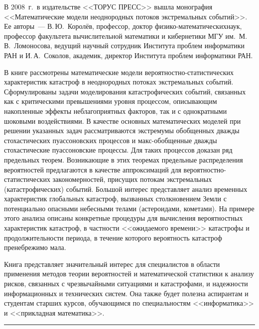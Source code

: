 \begin{multicols}{2}
 {\small
     В 2008~г.\ в издательстве <<ТОРУС ПРЕСС>> вышла монография <<Математические
модели неоднородных потоков экстремальных событий>>. Ее авторы~--- В.\,Ю.~Королёв,
профессор, доктор физико-математических\linebreak наук, профессор факультета вычислительной
математики и кибернетики МГУ им.\ М.\,В.~Ломоносова, ведущий научный сотрудник
Института проблем информатики РАН и И.\,А.~Соколов, академик, директор Института
проблем информатики РАН.

     В книге рассмотрены математические модели вероятностно-статистических
характеристик катастроф в неоднородных потоках экстремальных событий. Сформулированы
задачи моделирования катастрофических событий, связанных как с критическими
превышениями уровня процессом, описывающим накопленные эффекты неблагоприятных
факторов, так и с однократными шоковыми воздействиями. В качестве основных
математических моделей при решении указанных задач рассматриваются экстремумы
обобщенных дважды стохастических пуассоновских процессов и макс-обобщенные дважды
стохастические пуассоновские процессы. Для таких процессов доказан ряд предельных теорем.
Возникающие в этих теоремах предельные распределения вероятностей предлагаются в
качестве аппроксимаций для вероятностно-статистических закономерностей, присущих
потокам экстремальных (катастрофических) событий. Большой интерес представляет анализ
временных характеристик глобальных катастроф, вызванных столкновением Земли с
потенциально опасными небесными телами (астероидами, кометами). На примере этого
анализа описаны конкретные процедуры для вычисления вероятностных характеристик
катастроф, в частности <<ожидаемого времени>> катастрофы и продолжительности периода, в
течение которого вероятность катастроф пренебрежимо мала.

     Книга представляет значительный интерес для специалистов в области применения
методов теории вероятностей и математической статистики к анализу рисков, связанных с
чрезвычайными ситуациями и катастрофами, и надежности информационных и технических
сис\-тем. Она также будет полезна аспирантам и студентам старших курсов, обучающимся по
специальностям <<информатика>> и <<прикладная математика>>.
}

\end{multicols}


\vspace*{9pt}

\hrule

\vspace*{3pt}

